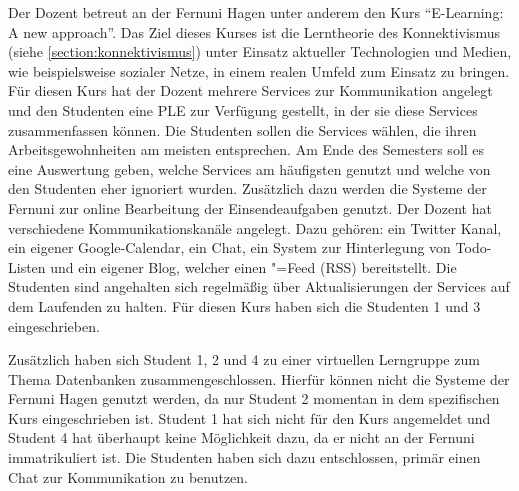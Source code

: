 Der Dozent betreut an der Fernuni Hagen unter anderem den Kurs "`E-Learning: A new approach"'. Das Ziel dieses Kurses ist die Lerntheorie des Konnektivismus (siehe \ref{section:konnektivismus}) unter Einsatz aktueller Technologien und Medien, wie beispielsweise sozialer Netze, in einem realen Umfeld zum Einsatz zu bringen. Für diesen Kurs hat der Dozent mehrere Services zur Kommunikation angelegt und den Studenten eine \ac{PLE} zur Verfügung gestellt, in der sie diese Services zusammenfassen können. Die Studenten sollen die Services wählen, die ihren Arbeitsgewohnheiten am meisten entsprechen. Am Ende des Semesters soll es eine Auswertung geben, welche Services am häufigsten genutzt und welche von den Studenten eher ignoriert wurden. Zusätzlich dazu werden die Systeme der Fernuni zur online Bearbeitung der Einsendeaufgaben genutzt. Der Dozent hat verschiedene Kommunikationskanäle angelegt. Dazu gehören: ein Twitter Kanal, ein eigener Google-Calendar, ein Chat, ein System zur Hinterlegung von Todo-Listen und ein eigener Blog, welcher einen "=Feed (\acl{RSS}) bereitstellt. Die Studenten sind angehalten sich regelmäßig über Aktualisierungen der Services auf dem Laufenden zu halten. Für diesen Kurs haben sich die Studenten 1 und 3 eingeschrieben.

Zusätzlich haben sich Student 1, 2 und 4 zu einer virtuellen Lerngruppe zum Thema Datenbanken zusammengeschlossen. Hierfür können nicht die Systeme der Fernuni Hagen genutzt werden, da nur Student 2 momentan in dem spezifischen Kurs eingeschrieben ist. Student 1 hat sich nicht für den Kurs angemeldet und Student 4 hat überhaupt keine Möglichkeit dazu, da er nicht an der Fernuni immatrikuliert ist. Die Studenten haben sich dazu entschlossen, primär einen Chat zur Kommunikation zu benutzen.

